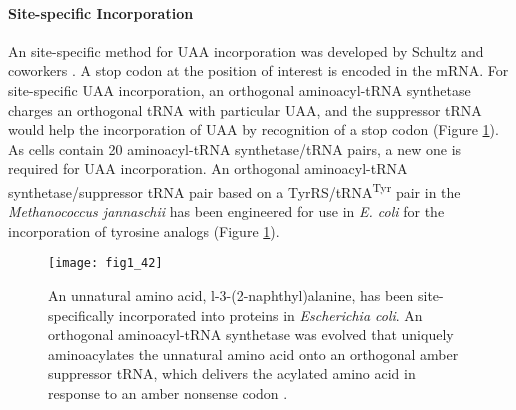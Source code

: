 \begin{refsection}
\paragraph{ Site-specific Incorporation}
An  site-specific method for UAA incorporation was developed by
Schultz and coworkers \cite{Wang2001,Wang2002}. A stop codon at the position of
interest is encoded in the mRNA. For  site-specific UAA
incorporation, an orthogonal aminoacyl-tRNA synthetase charges an orthogonal
tRNA with particular UAA, and the suppressor tRNA would help the incorporation
of UAA by recognition of a stop codon (Figure \ref{fig:invivo-ssi-intro}). As
cells contain 20 aminoacyl-tRNA synthetase/tRNA pairs, a new one is required
for UAA incorporation. An orthogonal aminoacyl-tRNA synthetase/suppressor tRNA
pair based on a TyrRS/tRNA\textsuperscript{Tyr} pair in the \emph{Methanococcus
jannaschii} has been engineered for use in \emph{E.  coli} for the
incorporation of tyrosine analogs \cite{Wang2001} (Figure
\ref{fig:invivo-ssi-intro}).
\begin{figure}[htbp] \centering \texttt{[image: fig1\_42]}
    \caption[An unnatural amino acid, l-3-(2-naphthyl)alanine, has been
        site-specifically incorporated into proteins in \emph{Escherichia
        coli}. An orthogonal aminoacyl-tRNA synthetase was evolved that
        uniquely aminoacylates the unnatural amino acid onto an orthogonal
        amber suppressor tRNA, which delivers the acylated amino acid in
        response to an amber nonsense codon.] {An unnatural amino acid,
            l-3-(2-naphthyl)alanine, has been site-specifically incorporated
            into proteins in \emph{Escherichia coli}. An orthogonal
            aminoacyl-tRNA synthetase was evolved that uniquely aminoacylates
            the unnatural amino acid onto an orthogonal amber suppressor tRNA,
            which delivers the acylated amino acid in response to an amber
            nonsense codon \cite{Wang2002}.}
        \label{fig:invivo-ssi-intro} 
\end{figure}


\end{refsection}
